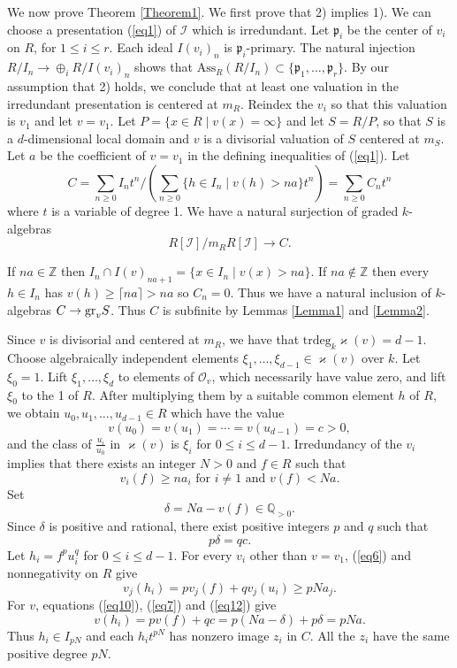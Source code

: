 \documentclass[11pt]{amsart}
\def\NZQ{\mathbb}               %
\def\QQ{{\NZQ Q}}
\def\ZZ{{\NZQ Z}}
\theoremstyle{definition}
\let\kappa=\varkappa
\begin{document}
We now prove Theorem \ref{Theorem1}. We first prove that 2) implies 1). We can choose a presentation (\ref{eq1}) of $\mathcal I$ which is irredundant. Let $\mathfrak p_i$ be the center of $v_i$ on $R$, for $1\le i\le r$. Each ideal $I(v_i)_n$ is $\mathfrak p_i$-primary. The natural injection $R/I_n\rightarrow \oplus_iR/I(v_i)_n$ shows that $\mbox{Ass}_R(R/I_n)\subset \{\mathfrak p_1,\ldots,\mathfrak p_r\}$. By our assumption that 2) holds, we conclude that at least one valuation in the irredundant presentation is centered at $m_R$. 
Reindex the $v_i$ so that this valuation is $v_1$ and let $v=v_1$. Let 
$P=\{x\in R\mid v(x)=\infty\}$ and let $S=R/P$, so that $S$ is a $d$-dimensional local domain and $v$ is a divisorial valuation of $S$ centered at $m_S$. Let $a$ be the coefficient of $v=v_1$ in the defining inequalities of (\ref{eq1}). Let
$$
C=\sum_{n\ge 0}I_nt^n/(\sum_{n\ge 0}\{h\in I_n\mid v(h)>na\}t^n)=\sum_{n\ge 0}C_nt^n
$$
where $t$ is a variable of degree 1. We have a natural surjection of graded $k$-algebras
\begin{equation}\label{eq4}
R[\mathcal I]/m_RR[\mathcal I]\rightarrow C.
\end{equation}

If $na\in \ZZ$ then $I_n\cap I(v)_{na+1}=\{x\in I_n\mid v(x)>na\}$.
If $na\not\in \ZZ$ then every $h\in I_n$ has $v(h)\ge \lceil na \rceil>na$ so $C_n=0$. Thus we have a natural inclusion of $k$-algebras $C\rightarrow {\rm gr}_{v}S$. Thus $C$ is subfinite by Lemmas \ref{Lemma1} and \ref{Lemma2}. 

Since $v$ is divisorial and centered at $m_R$, we have that $\mbox{trdeg}_k\kappa(v)=d-1$. Choose algebraically independent elements 
$\xi_1,\ldots,\xi_{d-1}\in \kappa(v)$ over $k$. Let $\xi_0=1$. Lift $\xi_1,\ldots,\xi_d$ to elements of  $\mathcal O_v$, which necessarily have value zero, and lift $\xi_0$ to the 1 of $R$. After multiplying them by a suitable common element $h$ of $R$, we obtain $u_0,u_1,\ldots, u_{d-1}\in R$ which have the value
\begin{equation}\label{eq10}
v(u_0)=v(u_1)=\cdots=v(u_{d-1})=c>0,
\end{equation}
and the class of $\frac{u_i}{u_0}$ in $\kappa(v)$ is $\xi_i$ for $0\le i\le d-1$. Irredundancy of the $v_i$ implies that there exists an integer $N>0$ and $f\in R$ such that 
\begin{equation}\label{eq6}
v_i(f)\ge na_i\mbox{ for $i\ne 1$ and $v(f)<Na$}.
\end{equation} 
Set
\begin{equation}\label{eq7}
\delta=Na-v(f)\in \QQ_{>0}.
\end{equation}
Since $\delta$ is positive and rational, there exist positive integers $p$ and $q$ such that
\begin{equation}\label{eq12}
p\delta=qc.
\end{equation}
Let $h_i=f^pu_i^q$ for $0\le i\le d-1$. For every $v_i$ other than $v=v_1$, (\ref{eq6}) and nonnegativity on $R$ give
$$
v_j(h_i)=pv_j(f)+qv_j(u_i)\ge pNa_j.
$$
For $v$, equations  (\ref{eq10}), (\ref{eq7}) and (\ref{eq12}) give
$$
v(h_i)=pv(f)+qc=p(Na-\delta)+p\delta=pNa.
$$
Thus $h_i\in I_{pN}$ and each $h_it^{pN}$ has nonzero image $z_i$ in $C$. All the $z_i$ have the same positive degree $pN$.
\end{document}
